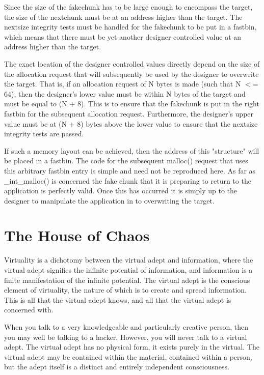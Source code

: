 \documentclass[12pt]{article}
\begin{document}
Since the size of the fakechunk has to be large enough to encompass
the target, the size of the nextchunk must be at an address higher
than the target. The nextsize integrity tests must be handled for
the fakechunk to be put in a fastbin, which means that there must
be yet another designer controlled value at an address higher than
the target.
\newline


The exact location of the designer controlled values directly
depend on the size of the allocation request that will subsequently
be used by the designer to overwrite the target. That is, if an
allocation request of N bytes is made (such that N $<$= 64), then the
designer's lower value must be within N bytes of the target and
must be equal to (N + 8). This is to ensure that the fakechunk is
put in the right fastbin for the subsequent allocation request.
Furthermore, the designer's upper value must be at (N + 8) bytes
above the lower value to ensure that the nextsize integrity tests
are passed.
\newline


If such a memory layout can be achieved, then the address of this
"structure" will be placed in a fastbin. The code for the
subsequent malloc() request that uses this arbitrary fastbin entry
is simple and need not be reproduced here. As far as \_int\_malloc()
is concerned the fake chunk that it is preparing to return to the
application is perfectly valid. Once this has occurred it is simply
up to the designer to manipulate the application in to overwriting
the target.
\newline

\section{The House of Chaos}



Virtuality is a dichotomy between the virtual adept and
information, where the virtual adept signifies the infinite
potential of information, and information is a finite manifestation
of the infinite potential. The virtual adept is the conscious
element of virtuality, the nature of which is to create and spread
information. This is all that the virtual adept knows, and all that
the virtual adept is concerned with.
\newline


When you talk to a very knowledgeable and particularly creative
person, then you may well be talking to a hacker. However, you will
never talk to a virtual adept. The virtual adept has no physical
form, it exists purely in the virtual. The virtual adept may be
contained within the material, contained within a person, but the
adept itself is a distinct and entirely independent consciousness.
\newline
\end{document}
